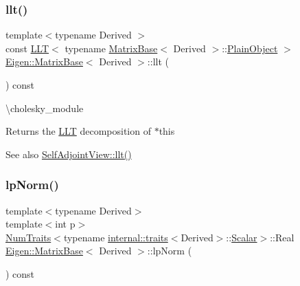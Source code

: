 \subsubsection{\texorpdfstring{llt()}{llt()}}
{\footnotesize\ttfamily template$<$typename Derived $>$ \\
const \mbox{\hyperlink{class_eigen_1_1_l_l_t}{L\+LT}}$<$ typename \mbox{\hyperlink{class_eigen_1_1_matrix_base}{Matrix\+Base}}$<$ Derived $>$\+::\mbox{\hyperlink{class_eigen_1_1_dense_base_aae45af9b5aca5a9caae98fd201f47cc4}{Plain\+Object}} $>$ \mbox{\hyperlink{class_eigen_1_1_matrix_base}{Eigen\+::\+Matrix\+Base}}$<$ Derived $>$\+::llt (\begin{DoxyParamCaption}{ }\end{DoxyParamCaption}) const\hspace{0.3cm}{\ttfamily [inline]}}

\textbackslash{}cholesky\+\_\+module \begin{DoxyReturn}{Returns}
the \mbox{\hyperlink{class_eigen_1_1_l_l_t}{L\+LT}} decomposition of {\ttfamily $\ast$this} 
\end{DoxyReturn}
\begin{DoxySeeAlso}{See also}
\mbox{\hyperlink{class_eigen_1_1_self_adjoint_view_a405e810491642a7f7b785f2ad6f93619}{Self\+Adjoint\+View\+::llt()}} 
\end{DoxySeeAlso}
\mbox{\label{class_eigen_1_1_matrix_base_ad5a1e4d317c85c0fdc3247b8117a35bf}} 
\subsubsection{\texorpdfstring{lpNorm()}{lpNorm()}}
{\footnotesize\ttfamily template$<$typename Derived$>$ \\
template$<$int p$>$ \\
\mbox{\hyperlink{struct_eigen_1_1_num_traits}{Num\+Traits}}$<$typename \mbox{\hyperlink{struct_eigen_1_1internal_1_1traits}{internal\+::traits}}$<$Derived$>$\+::\mbox{\hyperlink{class_eigen_1_1_dense_base_a5feed465b3a8e60c47e73ecce83e39a2}{Scalar}}$>$\+::Real \mbox{\hyperlink{class_eigen_1_1_matrix_base}{Eigen\+::\+Matrix\+Base}}$<$ Derived $>$\+::lp\+Norm (\begin{DoxyParamCaption}{ }\end{DoxyParamCaption}) const\hspace{0.3cm}{\ttfamily [inline]}}

